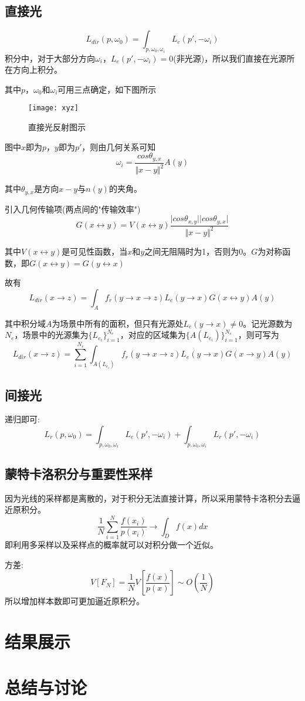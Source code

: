 \documentclass{article}
\begin{document}
	\subsection{直接光}
	   $$ L_{dir}(p,\omega_0)=\int_{p,\omega_0,\omega_i}L_e(p',-\omega_i) $$
	   积分中，对于大部分方向$\omega_i$，$L_e(p',-\omega_i)=0$(非光源)，所以我们直接在光源所在方向上积分。
	   
	   其中$p$，$\omega_0$和$\omega_i$可用三点确定，如下图所示
	    \begin{figure}[H]
	   	\begin{center}
	   		\texttt{[image: xyz]}
	   		\caption{直接光反射图示}	\label{xyz.label}
	   	\end{center}
	   \end{figure}
   
   图中$x$即为$p$，$y$即为$p'$，则由几何关系可知
    $$    \omega_i=\frac{cos\theta_{y,x}}{\Vert x-y \Vert^2}A(y)   $$
    
    其中$\theta_{y,x}$是方向$x-y$与$n(y)$的夹角。
    
    引入几何传输项(两点间的"传输效率")
       $$ G(x \leftrightarrow y)=V(x\leftrightarrow y)\frac{\vert cos\theta_{x,y} \vert \vert cos\theta_{y,x} \vert}{\Vert x-y \Vert^2} $$
       
    其中$V(x\leftrightarrow y)$是可见性函数，当$x$和$y$之间无阻隔时为1，否则为0。$G$为对称函数，即$ G(x \leftrightarrow y)= G(y \leftrightarrow x)$
    
    故有  $$  L_{dir}(x \rightarrow z)=\int_{A}f_r(y\rightarrow x \rightarrow z)L_e(y\rightarrow x ) G(x \leftrightarrow y)A(y) $$
    
    其中积分域$A$为场景中所有的面积，但只有光源处$L_e(y \rightarrow x) \ne 0$。记光源数为$N_e$，场景中的光源集为$\{L_{e_i} \}_{i=1}^{N_e}$，对应的区域集为$\{A(L_{e_i}) \}_{i=1}^{N_e}$，则可写为
    $$  L_{dir}(x\rightarrow z)=\sum_{i=1}^{N_e}\int_{A(L_{e_i})}f_r(y\rightarrow x\rightarrow z)L_e(y\rightarrow x)G(x\rightarrow y)A(y) $$
	
	\subsection{间接光}
	递归即可:
	 $$   L_{r}(p,\omega_0)=\int_{p,\omega_0,\omega_i}L_e(p',-\omega_i)+\int_{p,\omega_0,\omega_i}L_r(p',-\omega_i)   $$
	
	\subsection{蒙特卡洛积分与重要性采样}
	
	因为光线的采样都是离散的，对于积分无法直接计算，所以采用蒙特卡洛积分去逼近原积分。
	   $$  \frac{1}{N}\sum_{i=1}^{N}\frac{f(x_i)}{p(x_i)} \rightarrow \int_Df(x)dx $$
	即利用多采样以及采样点的概率就可以对积分做一个近似。
	
	方差:  $$ V[F_N] = \frac{1}{N}V[\frac{f(x)}{p(x)}] \sim O(\frac{1}{N}) $$
    所以增加样本数即可更加逼近原积分。
	
	
	
	
	\section{结果展示}
	
	
	\section{总结与讨论}
	
	
\end{document}
